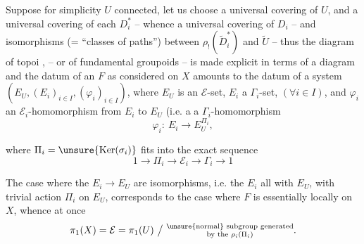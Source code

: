 Suppose for simplicity $U$ connected,
let us choose a universal covering  of $U$, and a
universal covering  of each $D_i^{*}$ -- whence a
universal covering  of $D_i$ -- and isomorphisms
(= ``classes of paths'') between $\rho_{!}(\widetilde D_i^{*})$ and $\widetilde U$
-- thus the diagram of topoi \unsure{(*)},
-- or of fundamental groupoids --
is made explicit in terms of a diagram
and the datum of an $F$ as considered on
$X$ amounts to the datum of a system
$(E_U,(E_i)_{i\in I},(\varphi_i)_{i\in I})$, where $E_U$ is an $\mathcal E$-set,
$E_i$ a $\Gamma_i$-set, $(\forall i\in I)$, and $\varphi_i$ an
$\mathcal E_i$-homomorphism from $E_i$ to $E_U$ (i.e. a
a $\Gamma_i$-homomorphism
\[
\varphi_i:\ E_i\longrightarrow E_U^{\Pi_i},
\]

where  $\Pi_i=\unsure{\operatorname{Ker}(\sigma_i)}$ fits into the exact sequence
\[
1\longrightarrow\Pi_i\longrightarrow\mathcal E_i\longrightarrow\Gamma_i\longrightarrow1
\]

The case where the $E_i\longrightarrow E_U$ are isomorphisms,
i.e. the $E_i$   all with $E_U$,
with trivial action  $\Pi_i$ on $E_U$, corresponds
to the case where $F$ is essentially locally  on $X$,
whence at once
\[
\pi_1(X)=\mathcal E=\pi_1(U)\ \big/\
\substack{\text{\unsure{normal} subgroup generated}\\
\text{by the }\rho_i(\Pi_i)}.
\]

